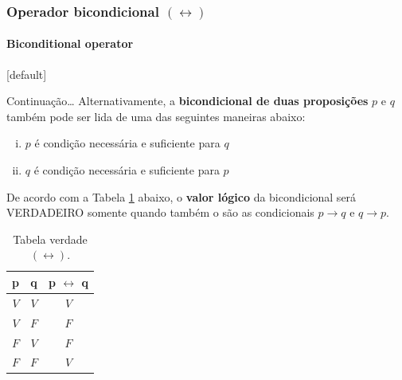\documentclass[10pt, headsepline, captions=tableabove, xcolor=table]{beamer}
\begin{document}
\begin{frame}[t]
    \frametitle{Operador bicondicional $(\leftrightarrow)$ }
    \framesubtitle{Biconditional operator}
    [default]
    \vspace{-2mm}
    \begin{block}{Continuação\dots}
        Alternativamente, a \textbf{bicondicional de duas proposições} $p$ e $q$ também pode ser lida de uma das seguintes maneiras abaixo:
        \begin{enumerate}[(i)]
            \item $p$ é condição necessária e suficiente para $q$
            \item $q$ é condição necessária e suficiente para $p$
        \end{enumerate}
        De acordo com a Tabela \ref{tab:tabela-bicondicao} abaixo, o \textbf{valor lógico} da bicondicional será VERDADEIRO somente quando também o são as condicionais $p \rightarrow q$ e $q \rightarrow p$.
    \end{block}
    \vspace{-4mm}
    \begin{table}[ht]
        \caption{Tabela verdade $(\leftrightarrow)$.}
        \label{tab:tabela-bicondicao}
        \begin{tabular}{|c|c|c|}
        \hline
        \rowcolor[HTML]{EFEFEF} 
        \textbf{p} & \textbf{q} & \textbf{p $\leftrightarrow$ q} \\ \hline
        $V$        & $V$        & $V$                            \\ \hline
        $V$        & $F$        & $F$                            \\ \hline
        $F$        & $V$        & $F$                            \\ \hline
        $F$        & $F$        & $V$                            \\ \hline
        \end{tabular}
    \end{table}
\end{frame}
%
\end{document}
